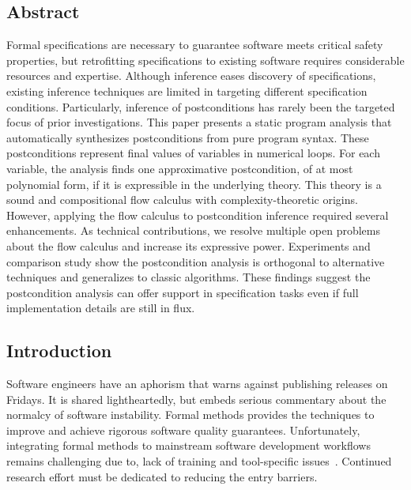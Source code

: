 \subsection*{Abstract}

Formal specifications are necessary to guarantee software meets critical safety
properties, but retrofitting specifications to existing software requires
considerable resources and expertise. Although inference eases discovery of
specifications, existing inference techniques are limited in targeting different
specification conditions. Particularly, inference of postconditions has rarely
been the targeted focus of prior investigations. This paper presents a static
program analysis that automatically synthesizes postconditions from pure program
syntax. These postconditions represent final values of variables in numerical
loops. For each variable, the analysis finds one approximative postcondition, of
at most polynomial form, if it is expressible in the underlying theory. This
theory is a sound and compositional flow calculus with complexity-theoretic
origins. However, applying the flow calculus to postcondition inference required
several enhancements. As technical contributions, we resolve multiple open
problems about the flow calculus and increase its expressive power. Experiments
and comparison study show the postcondition analysis is orthogonal to
alternative techniques and generalizes to classic algorithms. These findings
suggest the postcondition analysis can offer support in specification tasks even
if full implementation details are still in flux.

\subsection{Introduction}
\label{sec:pc-intro}

Software engineers have an aphorism that warns against publishing releases on
Fridays. It is shared lightheartedly, but embeds serious commentary about the
normalcy of software instability. Formal methods provides the techniques to
improve and achieve rigorous software quality guarantees. Unfortunately,
integrating formal methods to mainstream software development workflows remains
challenging due to, \eg lack of training and tool-specific
issues~\cite{beek2024}. Continued research effort must be dedicated to reducing
the entry barriers.

